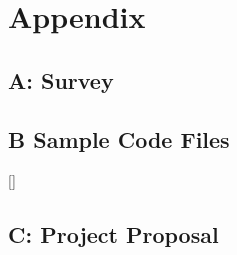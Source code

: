 \documentclass{article}
\begin{document}
\newpage

\newpage
\section*{Appendix}
    \subsection*{A: Survey}
        
    \subsection*{B Sample Code Files}
    []
    \subsection*{C: Project Proposal}
        
\end{document}
